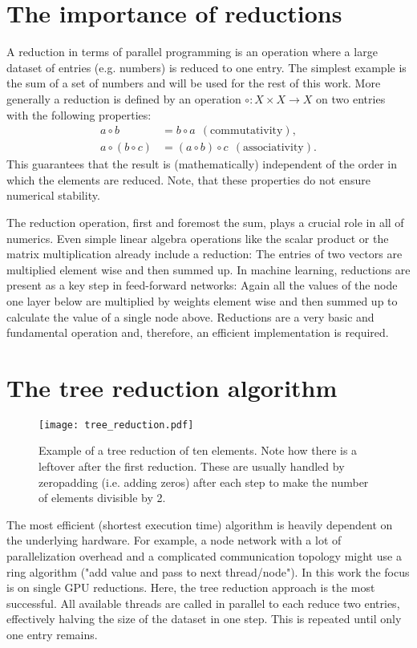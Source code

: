 \section{The importance of reductions}
A reduction in terms of parallel programming is an operation where a large dataset of entries (e.g. numbers) is reduced to one entry.
The simplest example is the sum of a set of numbers and will be used for the rest of this work.
More generally a reduction is defined by an operation \( \circ: X \times X \rightarrow X \) on two entries with the following properties:
\begin{align}
    a \circ b &= b \circ a \ \ \mathrm{(commutativity)}, \\
    a \circ (b \circ c) &= (a \circ b) \circ c \ \ \mathrm{(associativity)}.
\end{align}
This guarantees that the result is (mathematically) independent of the order in which the elements are reduced.
Note, that these properties do not ensure numerical stability.

The reduction operation, first and foremost the sum, plays a crucial role in all of numerics.
Even simple linear algebra operations like the scalar product or the matrix multiplication already include a reduction:
The entries of two vectors are multiplied element wise and then summed up.
In machine learning, reductions are present as a key step in feed-forward networks:
Again all the values of the node one layer below are multiplied by weights element wise and then summed up to calculate the value of a single node above.
Reductions are a very basic and fundamental operation and, therefore, an efficient implementation is required. 

\section{The tree reduction algorithm}
\begin{figure}
    \centering
    \texttt{[image: tree\_reduction.pdf]}
    \caption{
        Example of a tree reduction of ten elements.
        Note how there is a leftover after the first reduction.
        These are usually handled by zeropadding (i.e. adding zeros) after each step to make the number of elements divisible by 2.
    }
\end{figure}
The most efficient (shortest execution time) algorithm is heavily dependent on the underlying hardware.
For example, a node network with a lot of parallelization overhead and a complicated communication topology might use a ring algorithm ("add value and pass to next thread/node").
In this work the focus is on single GPU reductions.
Here, the tree reduction approach is the most successful.
All available threads are called in parallel to each reduce two entries, effectively halving the size of the dataset in one step.
This is repeated until only one entry remains.

